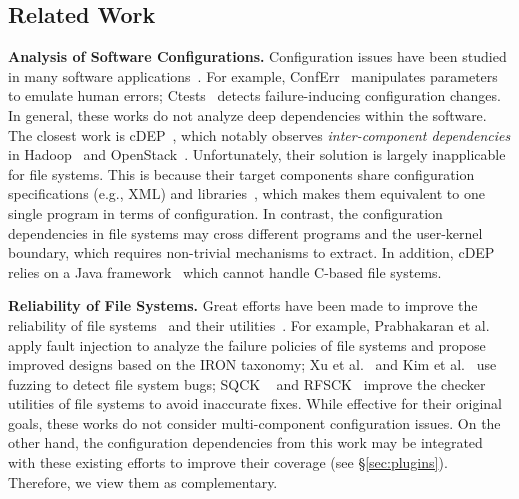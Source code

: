 \vspace{-0.05in}
\subsection{Related Work}
\label{sec:related}
\vspace{-0.05in}

\smallskip
\noindent
{\bf Analysis of Software Configurations.} 
Configuration issues have been  studied in many software applications~\cite{cdep,ctest-OSDI20,confu,Conferr-DSN08,spex,ConfigEverywhere-DongpuJin-ICSE14,NavigatingMazeBioinfo-MikaelaCashman-ASE18,ArielRabkin-ICSE11}. 
For example, ConfErr~\cite{Conferr-DSN08} manipulates parameters to emulate human errors;  
Ctests~\cite{ctest-OSDI20} detects failure-inducing configuration changes.
In general, these works do not analyze deep   dependencies within the  software.
The closest work is {cDEP}~\cite{cdep},
which notably observes \textit{inter-component dependencies} in  Hadoop~\cite{Hadoop} and OpenStack~\cite{OpenStack}. Unfortunately, their solution is largely inapplicable for file systems. 
This is because their target components share   configuration specifications (e.g., XML)  and libraries~\cite{ApacheCommonsConfiguraitons2}, which makes them equivalent to one single  program in terms of configuration. 
In contrast, 
the configuration dependencies in file systems may cross different programs and the user-kernel boundary, which requires  non-trivial mechanisms to extract.
In addition, cDEP relies on a Java   framework~\cite{soot} 
which cannot handle C-based file systems. 

\smallskip
\noindent
{\bf Reliability of File Systems.} 
Great efforts have been made to improve the reliability of 
file systems~\cite{bornholt2016specifying,recon12,hydra-2019,Changwoo-SOSP15-CrosscheckingFS,iron05} 
and  their  utilities~\cite{OmFAST18,Om-TOS18,SQCK,spiffy,SWIFT}.
For example, 
Prabhakaran et al.~\cite{iron05} apply fault injection to analyze the failure policies of  file
systems and propose improved designs based on the IRON taxonomy; 
Xu et al.~\cite{xu2019fuzzing} and Kim et al.~\cite{hydra-2019} use fuzzing to detect file system bugs;  
SQCK ~\cite{SQCK} and RFSCK~\cite{OmFAST18} improve the checker utilities of file systems to avoid inaccurate fixes. 
 While effective for their original  goals, these works do not consider multi-component configuration issues. 
 On the other hand, the configuration dependencies from this work may be integrated with these existing efforts to improve their coverage (see \S\ref{sec:plugins}).  
 Therefore, we view them as complementary. 
 
